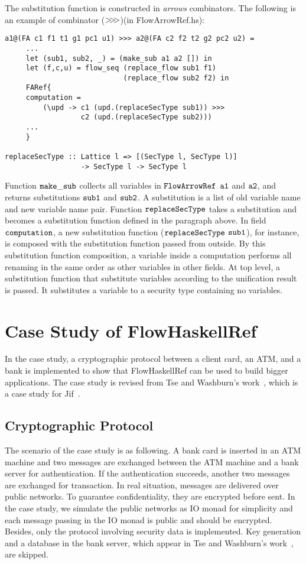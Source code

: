 \documentclass{report}
\newcommand{\arrowop}[1]{$#1\negthickspace #1\negthickspace #1$}
\newcommand{\co}[1]{$\cod{#1}$}
\begin{document}
The substitution function is constructed in {\em arrows} combinators. The following is an example of combinator
(\arrowop{>})(in FlowArrowRef.hs):
\begin{Verbatim}[fontsize=\small]
a1@(FA c1 f1 t1 g1 pc1 u1) >>> a2@(FA c2 f2 t2 g2 pc2 u2) =
     ...
     let (sub1, sub2, _) = (make_sub a1 a2 []) in
     let (f,c,u) = flow_seq (replace_flow sub1 f1) 
                            (replace_flow sub2 f2) in
     FARef{
     computation = 
         (\upd -> c1 (upd.(replaceSecType sub1)) >>>
                  c2 (upd.(replaceSecType sub2)))
     ...
     }

replaceSecType :: Lattice l => [(SecType l, SecType l)] 
                  -> SecType l -> SecType l
\end{Verbatim}
Function \co{make\_sub} collects all variables in \co{FlowArrowRef} \co{a1} and \co{a2}, and returns 
substitutions \co{sub1} and \co{sub2}. A substitution is a list of old variable name and new variable name pair. 
Function \co{replaceSecType} takes a substitution and becomes
a substitution function defined in the paragraph above. In field \co{computation}, a new substitution 
function (\co{replaceSecType} \co{sub1}), for instance,  
is composed with the substitution function
passed from outside. By this substitution function composition, a variable inside a computation 
performs all renaming in the same order as other variables in other fields. At top level, 
a substitution function that substitute variables according to the unification result is passed. 
It substitutes a variable to a security type containing no variables.

\chapter{Case Study of FlowHaskellRef}

In the case study, a cryptographic protocol between a client card, an ATM, and a bank is implemented
to show that FlowHaskellRef can be used to build bigger applications. The case study is revised
from Tse and Washburn's work~\cite{Tse:Washburn:jif}, which is a case study for Jif~\cite{jif}.

\section{Cryptographic Protocol}
The scenario of the case study is as following.
A bank card is inserted in an ATM machine and two messages are exchanged between the ATM 
machine and a bank server for authentication. If the authentication succeeds, another
two messages are exchanged for transaction. In real situation, messages are delivered over public
networks. To guarantee confidentiality, they are encrypted before sent. In the case study, we
simulate the public networks as IO monad for simplicity and each message passing in the IO monad is 
public and should be encrypted. Besides, only the protocol involving security data is implemented.
Key generation and a database in the bank server, which appear in 
Tse and Washburn's work~\cite{Tse:Washburn:jif}, are skipped.
\end{document}
